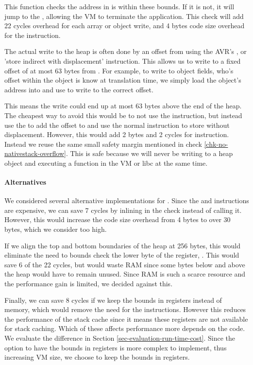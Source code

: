 This function checks the address in  is within these bounds. If it is not, it will jump to the , allowing the VM to terminate the application. This check will add 22 cycles overhead for each array or object write, and 4 bytes code size overhead for the  instruction.

The actual write to the heap is often done by an offset from  using the AVR's , or 'store indirect with displacement' instruction. This allows us to write to a fixed offset of at most 63 bytes from . For example, to write to object fields, who's offset within the object is know at translation time, we simply load the object's address into  and use  to write to the correct offset.

This means the write could end up at most 63 bytes above the end of the heap. The cheapest way to avoid this would be to not use the  instruction, but instead use the  to add the offset to  and use the normal  instruction to store without displacement. However, this would add 2 bytes and 2 cycles for instruction. Instead we reuse the same small safety margin mentioned in check \ref{chk-no-nativestack-overflow}. This is safe because we will never be writing to a heap object and executing a function in the VM or libc at the same time.

\paragraph{Alternatives}
We considered several alternative implementations for . Since the  and  instructions are expensive, we can save 7 cycles by inlining in the check instead of calling it. However, this would increase the code size overhead from 4 bytes to over 30 bytes, which we consider too high.

If we align the top and bottom boundaries of the heap at 256 bytes, this would eliminate the need to bounds check the lower byte of the  register, . This would save 6 of the 22 cycles, but would waste RAM since some bytes below and above the heap would have to remain unused. Since RAM is such a scarce resource and the performance gain is limited, we decided against this.

Finally, we can save 8 cycles if we keep the bounds in registers instead of memory, which would remove the need for the  instructions. However this reduces the performance of the stack cache since it means these registers are not available for stack caching. Which of these affects performance more depends on the code. We evaluate the difference in Section \ref{sec-evaluation-run-time-cost}. Since the option to have the bounds in registers is more complex to implement, thus increasing VM size, we choose to keep the bounds in registers.

